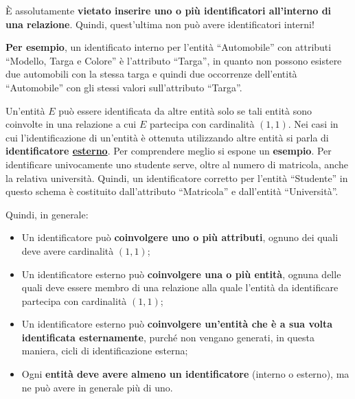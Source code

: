 \documentclass[a4paper]{article}
\newcommand{\dquotes}[1]{``#1''}
\begin{document}
	\noindent
	È assolutamente \textbf{vietato inserire uno o più identificatori all'interno di una relazione}. Quindi, quest'ultima non può avere identificatori interni!\newline
	
	\noindent
	\textbf{Per esempio}, un identificato interno per l'entità \dquotes{Automobile} con attributi \dquotes{Modello, Targa e Colore} è l'attributo \dquotes{Targa}, in quanto non possono esistere due automobili con la stessa targa e quindi due occorrenze dell'entità \dquotes{Automobile} con gli stessi valori sull'attributo \dquotes{Targa}.\newline
	
	\noindent
	Un'entità $E$ può essere identificata da altre entità solo se tali entità sono coinvolte in una relazione a cui $E$ partecipa con cardinalità $\left(1, 1\right)$. Nei casi in cui l'identificazione di un'entità è ottenuta utilizzando altre entità si parla di \textbf{identificatore \underline{esterno}}. \newline
	Per comprendere meglio si espone un \textbf{esempio}. Per identificare univocamente uno studente serve, oltre al numero di matricola, anche la relativa università. Quindi, un identificatore corretto per l'entità \dquotes{Studente} in questo schema è costituito dall'attributo \dquotes{Matricola} e dall'entità \dquotes{Università}.\newline
	
	\noindent
	Quindi, in generale:
	
	\begin{itemize}
		\item Un identificatore può \textbf{coinvolgere uno o più attributi}, ognuno dei quali deve avere cardinalità $\left(1,1\right)$;
		
		\item Un identificatore esterno può \textbf{coinvolgere una o più entità}, ognuna delle quali deve essere membro di una relazione alla quale l'entità da identificare partecipa con cardinalità $\left(1,1\right)$;
		
		\item Un identificatore esterno può \textbf{coinvolgere un'entità che è a sua volta identificata esternamente}, purché non vengano generati, in questa maniera, cicli di identificazione esterna;
		
		\item Ogni \textbf{entità deve avere almeno un identificatore} (interno o esterno), ma ne può avere in generale più di uno.
	\end{itemize}
\end{document}
